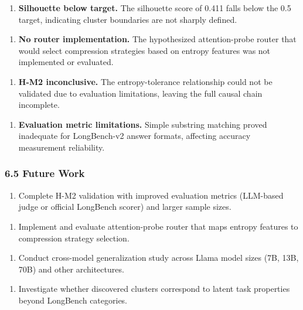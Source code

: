 \begin{enumerate}
\item \textbf{Silhouette below target.} The silhouette score of 0.411 falls below the 0.5 target, indicating cluster boundaries are not sharply defined.
\end{enumerate}

\begin{enumerate}
\item \textbf{No router implementation.} The hypothesized attention-probe router that would select compression strategies based on entropy features was not implemented or evaluated.
\end{enumerate}

\begin{enumerate}
\item \textbf{H-M2 inconclusive.} The entropy-tolerance relationship could not be validated due to evaluation limitations, leaving the full causal chain incomplete.
\end{enumerate}

\begin{enumerate}
\item \textbf{Evaluation metric limitations.} Simple substring matching proved inadequate for LongBench-v2 answer formats, affecting accuracy measurement reliability.
\end{enumerate}

\subsubsection{6.5 Future Work}

\begin{enumerate}
\item Complete H-M2 validation with improved evaluation metrics (LLM-based judge or official LongBench scorer) and larger sample sizes.
\end{enumerate}

\begin{enumerate}
\item Implement and evaluate attention-probe router that maps entropy features to compression strategy selection.
\end{enumerate}

\begin{enumerate}
\item Conduct cross-model generalization study across Llama model sizes (7B, 13B, 70B) and other architectures.
\end{enumerate}

\begin{enumerate}
\item Investigate whether discovered clusters correspond to latent task properties beyond LongBench categories.
\end{enumerate}
